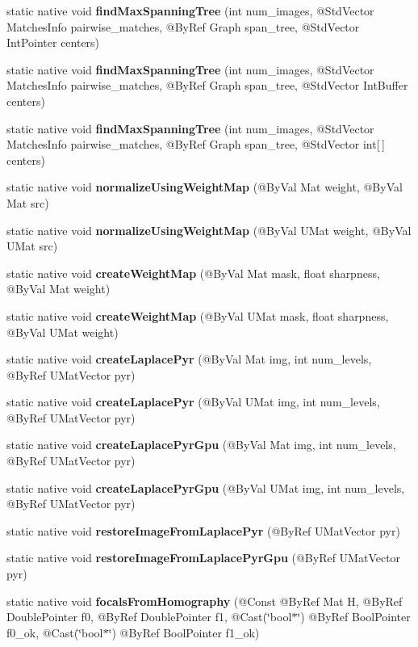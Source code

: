 \begin{DoxyCompactItemize}
\item 
static native void {\bfseries find\+Max\+Spanning\+Tree} (int num\+\_\+images, @Std\+Vector Matches\+Info pairwise\+\_\+matches, @By\+Ref Graph span\+\_\+tree, @Std\+Vector Int\+Pointer centers)
\item 
static native void {\bfseries find\+Max\+Spanning\+Tree} (int num\+\_\+images, @Std\+Vector Matches\+Info pairwise\+\_\+matches, @By\+Ref Graph span\+\_\+tree, @Std\+Vector Int\+Buffer centers)
\item 
static native void {\bfseries find\+Max\+Spanning\+Tree} (int num\+\_\+images, @Std\+Vector Matches\+Info pairwise\+\_\+matches, @By\+Ref Graph span\+\_\+tree, @Std\+Vector int\mbox{[}$\,$\mbox{]} centers)
\item 
static native void {\bfseries normalize\+Using\+Weight\+Map} (@By\+Val Mat weight, @By\+Val Mat src)
\item 
static native void {\bfseries normalize\+Using\+Weight\+Map} (@By\+Val U\+Mat weight, @By\+Val U\+Mat src)
\item 
static native void {\bfseries create\+Weight\+Map} (@By\+Val Mat mask, float sharpness, @By\+Val Mat weight)
\item 
static native void {\bfseries create\+Weight\+Map} (@By\+Val U\+Mat mask, float sharpness, @By\+Val U\+Mat weight)
\item 
static native void {\bfseries create\+Laplace\+Pyr} (@By\+Val Mat img, int num\+\_\+levels, @By\+Ref U\+Mat\+Vector pyr)
\item 
static native void {\bfseries create\+Laplace\+Pyr} (@By\+Val U\+Mat img, int num\+\_\+levels, @By\+Ref U\+Mat\+Vector pyr)
\item 
static native void {\bfseries create\+Laplace\+Pyr\+Gpu} (@By\+Val Mat img, int num\+\_\+levels, @By\+Ref U\+Mat\+Vector pyr)
\item 
static native void {\bfseries create\+Laplace\+Pyr\+Gpu} (@By\+Val U\+Mat img, int num\+\_\+levels, @By\+Ref U\+Mat\+Vector pyr)
\item 
static native void {\bfseries restore\+Image\+From\+Laplace\+Pyr} (@By\+Ref U\+Mat\+Vector pyr)
\item 
static native void {\bfseries restore\+Image\+From\+Laplace\+Pyr\+Gpu} (@By\+Ref U\+Mat\+Vector pyr)
\item 
static native void {\bfseries focals\+From\+Homography} (@Const @By\+Ref Mat H, @By\+Ref Double\+Pointer f0, @By\+Ref Double\+Pointer f1, @Cast(\char`\"{}bool$\ast$\char`\"{}) @By\+Ref Bool\+Pointer f0\+\_\+ok, @Cast(\char`\"{}bool$\ast$\char`\"{}) @By\+Ref Bool\+Pointer f1\+\_\+ok)

\end{DoxyCompactItemize}
